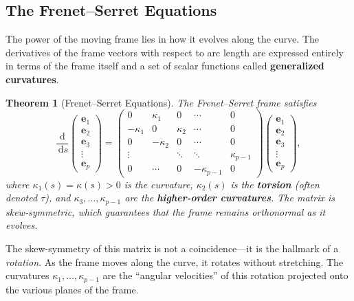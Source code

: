 \documentclass[12pt, openany]{book}
\theoremstyle{plain}
\newtheorem{theorem}{Theorem}[chapter]
\newcommand{\dd}{\mathrm{d}}
\newcommand{\ds}{\,\dd s}
\newcommand{\frenet}{\bm{e}}
\begin{document}
\subsection{The Frenet--Serret Equations}

The power of the moving frame lies in how it evolves along the curve. The
derivatives of the frame vectors with respect to arc length are expressed
entirely in terms of the frame itself and a set of scalar functions called
\textbf{generalized curvatures}.

\begin{theorem}[Frenet--Serret Equations]\label{thm:frenet_serret}
  The Frenet--Serret frame satisfies
  \begin{equation}\label{eq:frenet_serret}
    \frac{\dd}{\ds}
    \begin{pmatrix} \frenet_1 \\ \frenet_2 \\ \frenet_3 \\ \vdots \\ \frenet_p \end{pmatrix}
    =
    \begin{pmatrix}
      0 & \kappa_1 & 0 & \cdots & 0 \\
      -\kappa_1 & 0 & \kappa_2 & \cdots & 0 \\
      0 & -\kappa_2 & 0 & \cdots & 0 \\
      \vdots & & \ddots & \ddots & \kappa_{p-1} \\
      0 & \cdots & 0 & -\kappa_{p-1} & 0
    \end{pmatrix}
    \begin{pmatrix} \frenet_1 \\ \frenet_2 \\ \frenet_3 \\ \vdots \\ \frenet_p \end{pmatrix},
  \end{equation}
  where $\kappa_1(s) = \kappa(s) > 0$ is the curvature,
  $\kappa_2(s)$ is the \textbf{torsion} (often denoted $\tau$),
  and $\kappa_3, \ldots, \kappa_{p-1}$ are the
  \textbf{higher-order curvatures}. The matrix is skew-symmetric, which
  guarantees that the frame remains orthonormal as it evolves.
\end{theorem}

The skew-symmetry of this matrix is not a coincidence---it is the hallmark of
a \emph{rotation}. As the frame moves along the curve, it rotates without
stretching. The curvatures $\kappa_1, \ldots, \kappa_{p-1}$ are the
``angular velocities'' of this rotation projected onto the various planes of
the frame.
\end{document}
